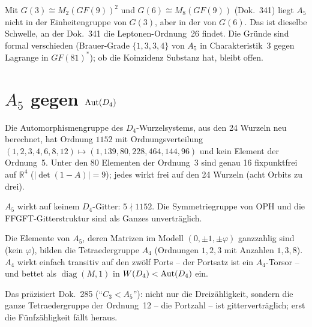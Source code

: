\begin{corollary}
Mit $G(3)\cong M_2(GF(9))^2$ und $G(6)\cong M_8(GF(9))$ (Dok.~341) liegt
$A_5$ nicht in der Einheitengruppe von $G(3)$, aber in der von $G(6)$.
Das ist dieselbe Schwelle, an der Dok.~341 die Leptonen-Ordnung~26 findet.
Die Gründe sind formal verschieden (Brauer-Grade $\{1,3,3,4\}$ von $A_5$
in Charakteristik~3 gegen Lagrange in $GF(81)^*$); ob die Koinzidenz
Substanz hat, bleibt offen.
\end{corollary}

\section[A5 gegen Aut(D4)]{$A_5$ gegen ${\rm Aut}(D_4)$}\label{sec:d4}

\begin{theorem}\label{thm:aut}
Die Automorphismengruppe des $D_4$-Wurzelsystems, aus den 24 Wurzeln neu
berechnet, hat Ordnung $1152$ mit Ordnungsverteilung
$(1,2,3,4,6,8,12)\mapsto(1,139,80,228,464,144,96)$ und kein Element der
Ordnung~5. Unter den 80 Elementen der Ordnung~3 sind genau 16 fixpunktfrei
auf $\mathbb{R}^4$ ($|\det(1-A)|=9$); jedes wirkt frei auf den 24 Wurzeln
(acht Orbits zu drei).
\end{theorem}

\begin{corollary}[\XM]
$A_5$ wirkt auf keinem $D_4$-Gitter: $5\nmid1152$. Die
Symmetriegruppe von OPH und die FFGFT-Gitterstruktur sind als Ganzes unverträglich.
\end{corollary}

\begin{theorem}\label{thm:a4}
Die Elemente von $A_5$, deren Matrizen im Modell $(0,\pm1,\pm\varphi)$
ganzzahlig sind (kein $\varphi$), bilden die Tetraedergruppe $A_4$
(Ordnungen $1,2,3$ mit Anzahlen $1,3,8$). $A_4$ wirkt einfach transitiv
auf den zwölf Ports -- der Portsatz ist ein $A_4$-Torsor -- und bettet als
$\operatorname{diag}(M,1)$ in $W(D_4)<{\rm Aut}(D_4)$ ein.
\end{theorem}

Das präzisiert Dok.~285 (\enquote{$C_3<A_5$}): nicht nur die Dreizähligkeit,
sondern die ganze Tetraedergruppe der Ordnung~12 -- die Portzahl -- ist
gitterverträglich; erst die Fünfzähligkeit fällt heraus.

